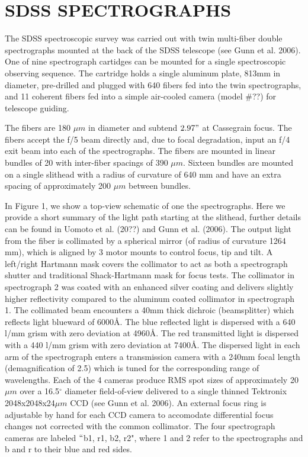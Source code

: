 \documentclass[12pt,preprint]{aastex}
\newcommand{\degree}{^\circ}
\begin{document}
\section{SDSS SPECTROGRAPHS}
\label{sec_spectrographs}

The SDSS spectroscopic survey was carried out with twin multi-fiber 
double spectrographs mounted at the back of the SDSS telescope 
(see Gunn et al.  2006).  
One of nine spectrograph cartidges can be mounted for a single
spectroscopic observing sequence.  The cartridge holds a single aluminum
plate, 813mm in diameter, pre-drilled and plugged with 640 fibers 
fed into the twin spectrographs, 
and 11 coherent fibers fed into a simple air-cooled camera (model \#??)
for telescope guiding.

The fibers are 180 $\mu m$ in diameter and subtend $2.97"$ at Cassegrain focus.
The fibers accept the f/5 beam directly and, due to focal degradation, input
an f/4 exit beam into each of the spectrographs.  The fibers are mounted in
linear bundles of 20 with inter-fiber spacings of 390 $\mu m$.  
Sixteen bundles are
mounted on a single slithead with a radius of curvature of 640 mm and have
an extra spacing of approximately 200 $\mu m$ between bundles.

In Figure 1, we show a top-view schematic of one the spectrographs.  Here
we provide a short summary of the light path starting at the slithead,
further details can be found in Uomoto et al. (20??) and Gunn et al. (2006).
The output light from the fiber is collimated by a spherical mirror
(of radius of curvature 1264 mm), which is aligned by 3 motor mounts to
control focus, tip and tilt.  A left/right Hartmann mask 
covers the collimator to act as both a spectrograph shutter and traditional 
Shack-Hartmann mask for focus tests.  The collimator in spectrograph 2
was coated with an enhanced silver coating and delivers slightly higher
reflectivity compared to the aluminum coated collimator in spectrograph 1.
The collimated beam encounters a 40mm thick dichroic (beamsplitter) which
reflects light blueward of 6000\AA.  The blue reflected light is dispersed
with a 640 l/mm grism with zero deviation at 4960\AA.  The red transmitted
light is dispersed with a 440 l/mm grism with zero deviation at 7400\AA.
The dispersed light in each arm of the spectrograph enters a transmission camera
with a 240mm focal length (demagnification of 2.5) which is tuned for the 
corresponding range of wavelengths.  Each of the 4 cameras produce RMS 
spot sizes of approximately 20$\mu m$ over a 16.5$\degree$ diameter 
field-of-view delivered to a single thinned Tektronix 2048x2048x24$\mu m$ CCD
(see Gunn et al. 2006).
An external focus ring is adjustable by hand for each CCD camera to accomodate
differential focus changes not corrected with the common collimator.
The four spectrograph cameras are labeled $``$b1, r1, b2, r2", where
1 and 2 refer to the spectrographs and b and r to their blue and red sides.  
\end{document}
